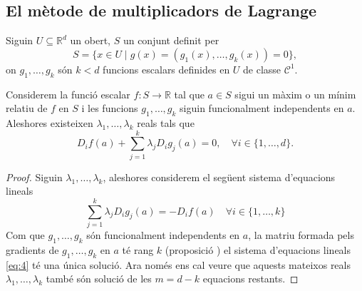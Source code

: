 \documentclass[../Apunts.tex]{subfiles}
\begin{document}
	\subsection{El mètode de multiplicadors de Lagrange} %
	\begin{theorem}
		\label{thm:Multiplicadors de Lagrange}
		Siguin \(U\subseteq\mathbb{R}^{d}\) un obert, \(S\) un conjunt definit per
		\[S=\{x\in U\mid g(x)=(g_{1}(x),\dots,g_{k}(x))=0\},\]
		on \(g_{1},\dots,g_{k}\) són \(k<d\) funcions escalars definides en \(U\) de classe \(\mathcal{C}^{1}\).
		
		Considerem la funció escalar \(f\colon S\to\mathbb{R}\) tal que \(a\in S\) sigui un màxim o un mínim relatiu de \(f\) en \(S\) i les funcions \(g_{1},\dots,g_{k}\) siguin funcionalment independents en \(a\). Aleshores existeixen \(\lambda_{1},\dots,\lambda_{k}\) reals tals que
		\[D_{i}f(a)+\sum_{j=1}^{k}\lambda_{j}D_{i}g_{j}(a)=0,\quad\forall i\in\{1,\dots,d\}.\]
		\begin{proof}
			Siguin \(\lambda_{1},\dots,\lambda_{k}\), aleshores considerem el següent sistema d'equacions lineals
			\begin{equation}\label{eq:4}
			\sum_{j=1}^{k}\lambda_{j}D_{i}g_{j}(a)=-D_{i}f(a)\quad\forall i\in\{1,\dots,k\}
			\end{equation}
			Com que \(g_{1},\dots,g_{k}\) són funcionalment independents en \(a\), la matriu formada pels gradients de \(g_{1},\dots,g_{k}\) en \(a\) té rang \(k\) (proposició ) el sistema d'equacions lineals \eqref{eq:4} té una única solució. Ara només ens cal veure que aquests mateixos reals \(\lambda_{1},\dots,\lambda_{k}\) també són solució de les \(m=d-k\) equacions restants.
			

\end{proof}
\end{theorem}
\end{document}
